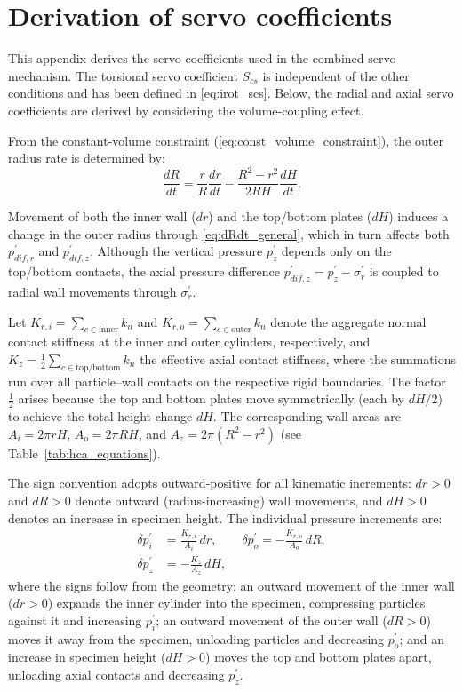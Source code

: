 \documentclass[a4paper,fleqn]{cas-sc}
\begin{document}
 \section{Derivation of servo coefficients}
\label{sec:appendix_servo}

This appendix derives the servo coefficients used in the combined servo mechanism. The torsional servo coefficient $S_{cs}$ is independent of the other conditions and has been defined in \cref{eq:irot_scs}. Below, the radial and axial servo coefficients are derived by considering the volume-coupling effect.

From the constant-volume constraint (\cref{eq:const_volume_constraint}), the outer radius rate is determined by:
\begin{equation}
\frac{dR}{dt} = \frac{r}{R}\frac{dr}{dt} - \frac{R^2-r^2}{2RH}\frac{dH}{dt}.
\label{eq:dRdt_general}
\end{equation}

Movement of both the inner wall ($dr$) and the top/bottom plates ($dH$) induces a change in the outer radius through \cref{eq:dRdt_general}, which in turn affects both $p_{dif,r}^{\prime}$ and $p_{dif,z}^{\prime}$. Although the vertical pressure $p_z^{\prime}$ depends only on the top/bottom contacts, the axial pressure difference $p_{dif,z}^{\prime}=p_z^{\prime}-\sigma_r^{\prime}$ is coupled to radial wall movements through $\sigma_r^{\prime}$.

Let $K_{r,i}=\sum_{c\in\mathrm{inner}} k_n$ and $K_{r,o}=\sum_{c\in\mathrm{outer}} k_n$ denote the aggregate normal contact stiffness at the inner and outer cylinders, respectively, and $K_z=\frac{1}{2}\sum_{c\in\mathrm{top/bottom}} k_n$ the effective axial contact stiffness, where the summations run over all particle--wall contacts on the respective rigid boundaries. The factor $\frac{1}{2}$ arises because the top and bottom plates move symmetrically (each by $dH/2$) to achieve the total height change $dH$. The corresponding wall areas are $A_i=2\pi rH$, $A_o=2\pi RH$, and $A_z=2\pi(R^2-r^2)$ (see Table~\ref{tab:hca_equations}).

The sign convention adopts outward-positive for all kinematic increments: $dr>0$ and $dR>0$ denote outward (radius-increasing) wall movements, and $dH>0$ denotes an increase in specimen height. The individual pressure increments are:
\begin{align}
\delta p_i^{\prime} &= \frac{K_{r,i}}{A_i}\,dr,\qquad
\delta p_o^{\prime} = -\frac{K_{r,o}}{A_o}\,dR, \label{eq:dp_individual_r}\\[4pt]
\delta p_z^{\prime} &= -\frac{K_z}{A_z}\,dH, \label{eq:dp_individual_z}
\end{align}
where the signs follow from the geometry: an outward movement of the inner wall ($dr>0$) expands the inner cylinder into the specimen, compressing particles against it and increasing $p_i^{\prime}$; an outward movement of the outer wall ($dR>0$) moves it away from the specimen, unloading particles and decreasing $p_o^{\prime}$; and an increase in specimen height ($dH>0$) moves the top and bottom plates apart, unloading axial contacts and decreasing $p_z^{\prime}$.
\end{document}

